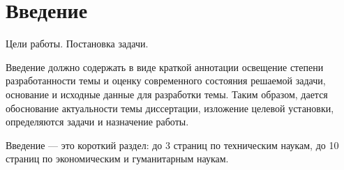 \chapter*{Введение}

Цели работы.
Постановка задачи.

Введение должно содержать в виде краткой аннотации освещение степени
разработанности темы и оценку современного состояния решаемой задачи,
основание и исходные данные для разработки темы.
Таким образом, дается обоснование актуальности темы диссертации,
изложение целевой установки, определяются задачи и назначение работы.

Введение --- это короткий раздел: до 3 страниц по техническим наукам,
до 10 страниц по экономическим и гуманитарным наукам.